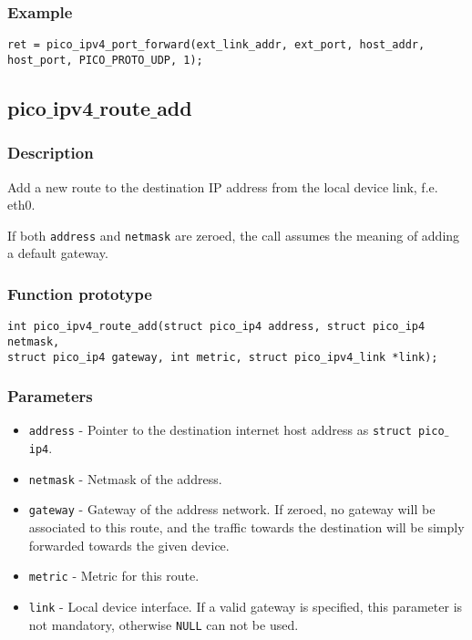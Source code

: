 \subsubsection*{Example}
\begin{verbatim}
ret = pico_ipv4_port_forward(ext_link_addr, ext_port, host_addr,
host_port, PICO_PROTO_UDP, 1);
\end{verbatim}



\subsection{pico$\_$ipv4$\_$route$\_$add}

\subsubsection*{Description}
Add a new route to the destination IP address from the local device link, f.e. eth0.

If both \texttt{address} and \texttt{netmask} are zeroed, the call assumes the meaning of adding a default gateway.

\subsubsection*{Function prototype}
\begin{verbatim}
int pico_ipv4_route_add(struct pico_ip4 address, struct pico_ip4 netmask,
struct pico_ip4 gateway, int metric, struct pico_ipv4_link *link);
\end{verbatim}

\subsubsection*{Parameters}
\begin{itemize}[noitemsep]
\item \texttt{address} - Pointer to the destination internet host address as \texttt{struct pico$\_$ip4}.
\item \texttt{netmask} - Netmask of the address.
\item \texttt{gateway} - Gateway of the address network. If zeroed, no gateway will be associated to this route, and the traffic towards the destination will be simply forwarded towards the given device.
\item \texttt{metric} - Metric for this route.
\item \texttt{link} - Local device interface. If a valid gateway is specified, this parameter is not mandatory, otherwise \texttt{NULL} can not be used.
\end{itemize}

